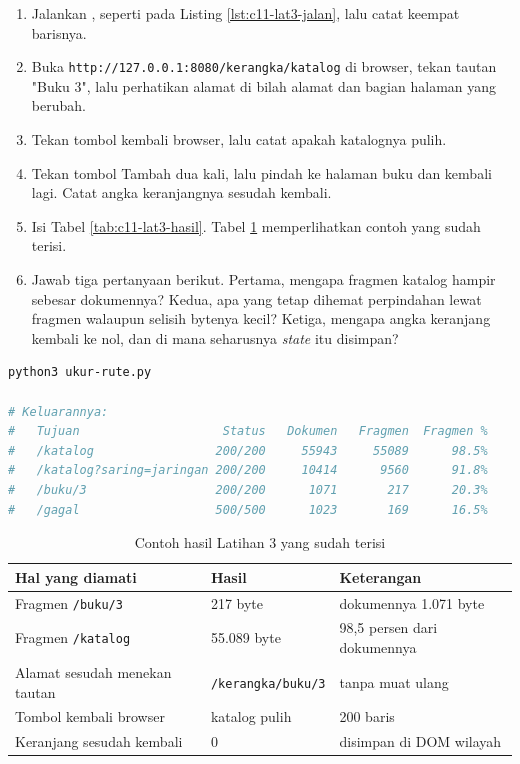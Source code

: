 \begin{enumerate}
  \item Jalankan , seperti pada Listing
        \ref{lst:c11-lat3-jalan}, lalu catat keempat barisnya.
  \item Buka \texttt{http://127.0.0.1:8080/kerangka/katalog} di browser,
        tekan tautan "Buku 3", lalu perhatikan alamat di bilah alamat dan
        bagian halaman yang berubah.
  \item Tekan tombol kembali browser, lalu catat apakah katalognya pulih.
  \item Tekan tombol Tambah dua kali, lalu pindah ke halaman buku dan
        kembali lagi. Catat angka keranjangnya sesudah kembali.
  \item Isi Tabel \ref{tab:c11-lat3-hasil}. Tabel \ref{tab:c11-lat3-contoh}
        memperlihatkan contoh yang sudah terisi.
  \item Jawab tiga pertanyaan berikut. Pertama, mengapa fragmen katalog
        hampir sebesar dokumennya? Kedua, apa yang tetap dihemat perpindahan
        lewat fragmen walaupun selisih bytenya kecil? Ketiga, mengapa angka
        keranjang kembali ke nol, dan di mana seharusnya \textit{state} itu
        disimpan?
\end{enumerate}

\begin{lstlisting}[language=bash, caption={Membandingkan ukuran dokumen dan fragmen, tersedia di \berkas{sources/chapter11/ukur-rute.py}}, label={lst:c11-lat3-jalan}]
python3 ukur-rute.py

# Keluarannya:
#   Tujuan                    Status   Dokumen   Fragmen  Fragmen %
#   /katalog                 200/200     55943     55089      98.5%
#   /katalog?saring=jaringan 200/200     10414      9560      91.8%
#   /buku/3                  200/200      1071       217      20.3%
#   /gagal                   500/500      1023       169      16.5%
\end{lstlisting}

\begin{table}[!htb]
  \centering
  \caption{Contoh hasil Latihan 3 yang sudah terisi}
  \label{tab:c11-lat3-contoh}
  \begin{tabularx}{\textwidth}{Xll}
    \hline
    \textbf{Hal yang diamati} & \textbf{Hasil} & \textbf{Keterangan} \\
    \hline
    Fragmen \texttt{/buku/3} & 217 byte & dokumennya 1.071 byte \\
    \hline
    Fragmen \texttt{/katalog} & 55.089 byte & 98,5 persen dari dokumennya \\
    \hline
    Alamat sesudah menekan tautan & \texttt{/kerangka/buku/3} & tanpa muat ulang \\
    \hline
    Tombol kembali browser & katalog pulih & 200 baris \\
    \hline
    Keranjang sesudah kembali & 0 & disimpan di DOM wilayah \\
    \hline
  \end{tabularx}
\end{table}

